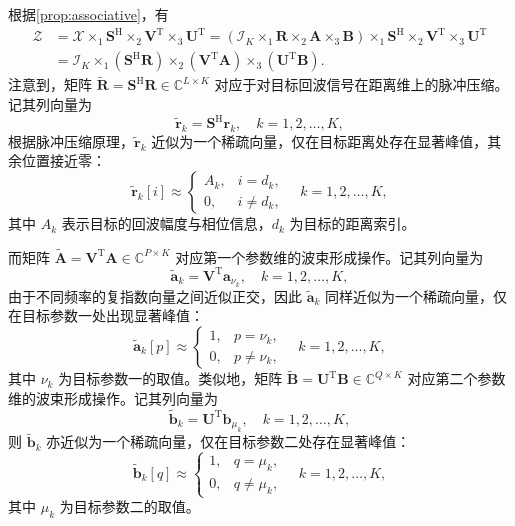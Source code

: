 根据\cref{prop:associative}，有
\[
    \begin{split}
        \mathcal{Z}
         & = \mathcal{X} \times_1 \mathbf{S}^{\mathrm{H}} \times_2 \mathbf{V}^{\mathrm{T}} \times_3 \mathbf{U}^{\mathrm{T}}
        = \left( \mathcal{I}_K \times_1 \mathbf{R} \times_2 \mathbf{A} \times_3 \mathbf{B} \right)
        \times_1 \mathbf{S}^{\mathrm{H}} \times_2 \mathbf{V}^{\mathrm{T}} \times_3 \mathbf{U}^{\mathrm{T}}                  \\
         & = \mathcal{I}_K \times_1 \left( \mathbf{S}^{\mathrm{H}} \mathbf{R} \right)
        \times_2 \left( \mathbf{V}^{\mathrm{T}} \mathbf{A} \right)
        \times_3 \left( \mathbf{U}^{\mathrm{T}} \mathbf{B} \right).
    \end{split}
\]
注意到，矩阵 \( \tilde{\mathbf{R}} = \mathbf{S}^{\mathrm{H}} \mathbf{R} \in \mathbb{C}^{L \times K} \) 对应于对目标回波信号在距离维上的脉冲压缩。记其列向量为
\[
    \tilde{\bm{r}}_k = \mathbf{S}^{\mathrm{H}} \bm{r}_k,
    \quad k=1,2,\dots,K,
\]
根据脉冲压缩原理，\( \tilde{\bm{r}}_k \) 近似为一个稀疏向量，仅在目标距离处存在显著峰值，其余位置接近零：
\[
    \tilde{\bm{r}}_k[i] \approx
    \begin{cases}
        A_k, & i = d_k,    \\
        0,   & i \neq d_k,
    \end{cases}
    \quad k=1,2,\dots,K,
\]
其中 \( A_k \) 表示目标的回波幅度与相位信息，\( d_k \) 为目标的距离索引。

而矩阵 \( \tilde{\mathbf{A}} =  \mathbf{V}^{\mathrm{T}} \mathbf{A} \in \mathbb{C}^{P \times K} \) 对应第一个参数维的波束形成操作。记其列向量为
\[
    \tilde{\bm{a}}_k = \mathbf{V}^{\mathrm{T}} \bm{a}_{\nu_k},
    \quad k=1,2,\dots,K,
\]
由于不同频率的复指数向量之间近似正交，因此 \( \tilde{\bm{a}}_k \) 同样近似为一个稀疏向量，仅在目标参数一处出现显著峰值：
\[
    \tilde{\bm{a}}_k[p] \approx
    \begin{cases}
        1, & p = \nu_k,    \\
        0, & p \neq \nu_k,
    \end{cases}
    \quad k=1,2,\dots,K,
\]
其中 \( \nu_k \) 为目标参数一的取值。类似地，矩阵 \(  \tilde{\mathbf{B}} = \mathbf{U}^{\mathrm{T}} \mathbf{B} \in \mathbb{C}^{Q \times K} \) 对应第二个参数维的波束形成操作。记其列向量为
\[
    \tilde{\bm{b}}_k = \mathbf{U}^{\mathrm{T}} \bm{b}_{\mu_k},
    \quad k=1,2,\dots,K,
\]
则 \( \tilde{\bm{b}}_k \) 亦近似为一个稀疏向量，仅在目标参数二处存在显著峰值：
\[
    \tilde{\bm{b}}_k[q] \approx
    \begin{cases}
        1, & q = \mu_k,    \\
        0, & q \neq \mu_k,
    \end{cases}
    \quad k=1,2,\dots,K,
\]
其中 \( \mu_k \) 为目标参数二的取值。

